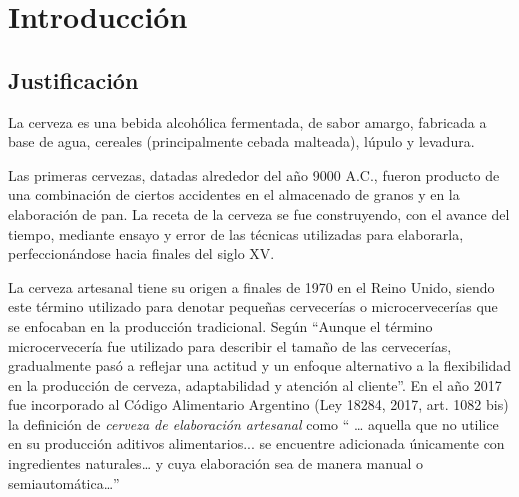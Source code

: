 \chapter{Introducción}
\section{Justificación}
    \par
    La cerveza es una bebida alcohólica fermentada, de sabor amargo, fabricada a base de agua, cereales (principalmente cebada malteada), lúpulo y levadura.
    \par
    Las primeras cervezas, datadas alrededor del año 9000 A.C., fueron producto de una combinación de ciertos accidentes en el almacenado de granos y en la elaboración de pan. La receta de la cerveza se fue construyendo, con el avance del tiempo, mediante ensayo y error de las técnicas utilizadas para elaborarla, perfeccionándose hacia finales del siglo XV.
    \par
    La cerveza artesanal tiene su origen a finales de 1970 en el Reino Unido, siendo este término utilizado para denotar pequeñas cervecerías o microcervecerías que se enfocaban en la producción tradicional. Según \cite{Calvillo17} “Aunque el término microcervecería fue utilizado para describir el tamaño de las cervecerías, gradualmente pasó a reflejar una actitud y un enfoque alternativo a la flexibilidad en la producción de cerveza, adaptabilidad y atención al cliente”. En el año 2017 fue incorporado al Código Alimentario Argentino (Ley 18284, 2017, art. 1082 bis) la definición de \textit{cerveza de elaboración artesanal} como “ … aquella que no utilice en su producción aditivos alimentarios... se encuentre adicionada únicamente con ingredientes naturales… y cuya elaboración sea de manera manual o semiautomática…”
    
    

